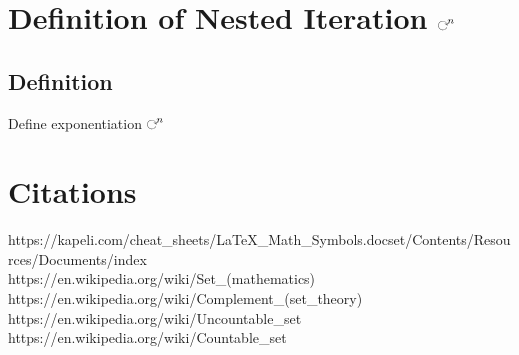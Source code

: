 \documentclass[11pt]{article}
\def \nestedloop {\ensuremath{\rotatebox[origin=c]{-90}{$\circlearrowright$}}^n}
\begin{document}
\section{Definition of Nested Iteration $\nestedloop$}
\subsection{Definition}
Define exponentiation $\nestedloop$



\section{Citations}
\rbrack \hspace{1mm} https://kapeli.com/cheat\_sheets/LaTeX\_Math\_Symbols.docset/Contents/Resources/Documents/index\\
\rbrack \hspace{1mm} https://en.wikipedia.org/wiki/Set\_(mathematics) \\
 \rbrack \hspace{1mm} https://en.wikipedia.org/wiki/Complement\_(set\_theory)\\
 \rbrack https://en.wikipedia.org/wiki/Uncountable\_set\\
 \rbrack https://en.wikipedia.org/wiki/Countable\_set\\
\end{document}
